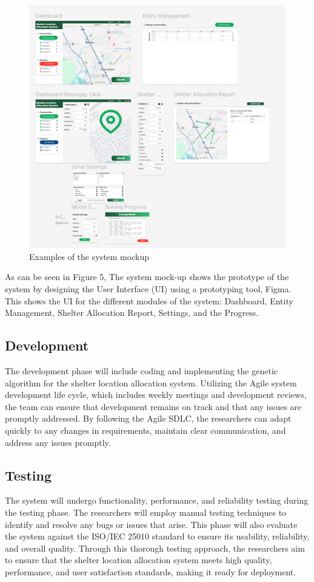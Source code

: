 	\begin{figure}[h!]
		\caption{Examples of the system mockup}
		\centering
		\includegraphics[width=\textwidth]{SYSTEM MOCKUP}
	\end{figure}
	
	As can be seen in Figure 5, The system mock-up shows the prototype of the system by designing the User Interface (UI) using a prototyping tool, Figma. This shows the UI for the different modules of the system: Dashboard, Entity Management, Shelter Allocation Report, Settings, and the Progress.

\subsection{Development}
	The development phase will include coding and implementing the genetic algorithm for the shelter location allocation system. Utilizing the Agile system development life cycle, which includes weekly meetings and development reviews, the team can ensure that development remains on track and that any issues are promptly addressed. By following the Agile SDLC, the researchers can adapt quickly to any changes in requirements, maintain clear communication, and address any issues promptly.
	
\subsection{Testing}
	The system will undergo functionality, performance, and reliability testing during the testing phase. The researchers will employ manual testing techniques to identify and resolve any bugs or issues that arise. This phase will also evaluate the system against the ISO/IEC 25010 standard to ensure its usability, reliability, and overall quality. Through this thorough testing approach, the researchers aim to ensure that the shelter location allocation system meets high quality, performance, and user satisfaction standards, making it ready for deployment.
	
